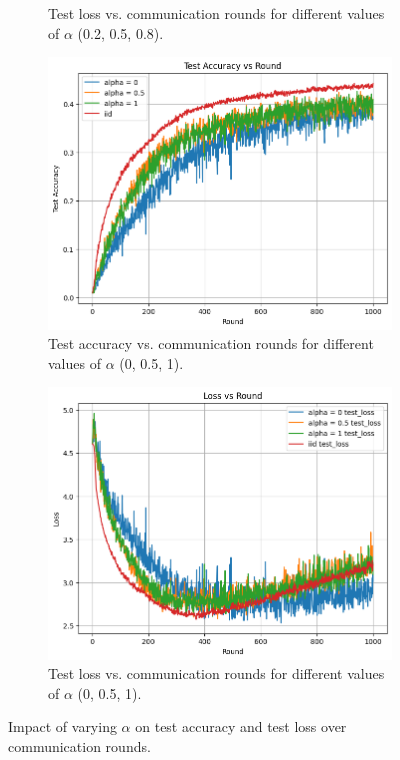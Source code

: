 \documentclass[10pt,twocolumn,letterpaper]{article}
\begin{document}
\begin{enumerate}
\begin{figure}[H]
\begin{subfigure}{0.48\linewidth}
            \caption{Test loss vs. communication rounds for different values of $\alpha$ (0.2, 0.5, 0.8).}
            \label{fig:testLoss}
        \end{subfigure}
        \begin{subfigure}{0.48\linewidth}
            \centering
            \includegraphics[width=\textwidth]{figs/diversity_test_acc_round_0_0.5_1.png}
            \caption{Test accuracy vs. communication rounds for different values of $\alpha$ (0, 0.5, 1).}
            \label{fig:testAcc1}
        \end{subfigure}
        \hfill
        \begin{subfigure}{0.48\linewidth}
            \centering
            \includegraphics[width=\textwidth]{figs/diversity_test_loss_round_0_0.5_1.png}
            \caption{Test loss vs. communication rounds for different values of $\alpha$ (0, 0.5, 1).}
            \label{fig:testLoss1}
        \end{subfigure}
        \caption{Impact of varying $\alpha$ on test accuracy and test loss over communication rounds.}
        \label{fig:confronto}
    \end{figure}


\end{enumerate}
\end{document}
